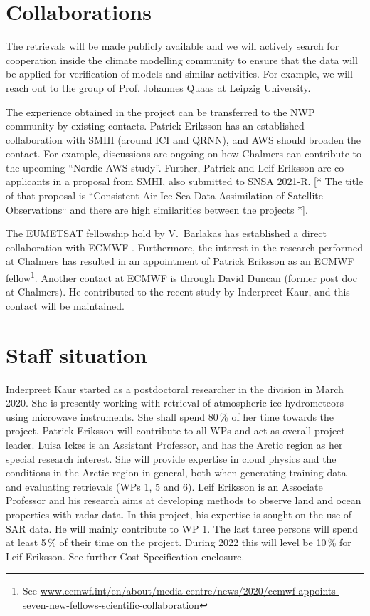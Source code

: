 \documentclass[12pt,oneside,a4paper]{article}
\newcommand\intodo[1]{{\color{red} [* #1 *]}}
\begin{document}
\section{Collaborations}
%
\label{sec:collaborations}
The retrievals will be made publicly available and we will actively search
for cooperation inside the climate modelling community to ensure that the 
data will be applied for verification of models and similar activities. For example, we will reach out to the group of Prof. Johannes Quaas at Leipzig University. 


The experience obtained in the project can be transferred to the NWP community
by existing contacts. Patrick Eriksson has an established collaboration with
SMHI (around ICI and QRNN), and AWS should broaden the contact. For example,
discussions are ongoing on how Chalmers can contribute to the upcoming
``Nordic AWS study''. Further, Patrick and Leif Eriksson are co-applicants in a
proposal from SMHI, also submitted to SNSA 2021-R. \intodo{The title of that proposal
is ``Consistent Air-Ice-Sea Data Assimilation of Satellite Observations`` and
there are high similarities between the projects}.

The EUMETSAT fellowship hold by V.\ Barlakas has established a direct
collaboration with ECMWF \citep{barlakas:intro:21}. Furthermore, the interest
in the research performed at Chalmers has resulted in an appointment of Patrick
Eriksson as an ECMWF fellow\footnote{See 
	\url{www.ecmwf.int/en/about/media-centre/news/2020/ecmwf-appoints-seven-new-fellows-scientific-collaboration}}.
Another contact at ECMWF is through David Duncan (former post doc at Chalmers).
He contributed to the recent study by Inderpreet Kaur, and this contact will be
maintained.
\section{Staff situation}
%
\label{sec:staff}
Inderpreet Kaur started as a postdoctoral researcher in the division in March
2020. She is presently working with retrieval of atmospheric ice hydrometeors
using microwave instruments. She shall spend 80\,\% of her time towards the
project. Patrick Eriksson will contribute to all WPs and act as overall project
leader. Luisa Ickes is an Assistant Professor, and has the Arctic region as her
special research interest. She will provide expertise in cloud physics and the
conditions in the Arctic region in general, both when generating training data
and evaluating retrievals (WPs 1, 5 and 6). Leif Eriksson is an Associate
Professor and his research aims at developing methods to observe land and ocean
properties with radar data. In this project, his expertise is sought on the use
of SAR data. He will mainly contribute to WP 1. The
last three persons will spend at least 5\,\% of their time on the project.
During 2022 this will level be 10\,\% for Leif Eriksson. See further Cost
Specification enclosure.
\end{document}
